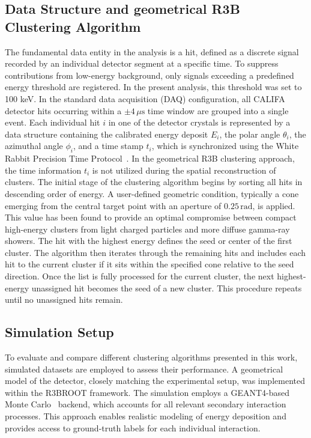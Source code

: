 \documentclass[final,5p,times,twocolumn]{elsarticle}
\begin{document}
\subsection{Data Structure and geometrical R3B Clustering Algorithm}\label{s_sec:r3b_clustering}
The fundamental data entity in the analysis is a hit, defined as a discrete signal recorded by an individual detector segment at a specific time. To suppress contributions from low-energy background, only signals exceeding a predefined energy threshold are registered. In the present analysis, this threshold was set to 100 keV.\newline
In the standard data acquisition (DAQ) configuration, all CALIFA detector hits occurring within a $\pm 4\,\mu\mathrm{s}$ time window are grouped into a single event. Each individual hit \( i \) in one of the detector crystals is represented by a data structure containing the calibrated energy deposit \( E_i \), the polar angle \( \theta_i \), the azimuthal angle \( \phi_i \), and a time stamp \( t_i \), which is synchronized using the White Rabbit Precision Time Protocol~\cite{lipinski2011white}.\newline
In the geometrical R3B clustering approach, the time information $t_i$ is not utilized during the spatial reconstruction of clusters.\newline
The initial stage of the clustering algorithm begins by sorting all hits in descending order of energy. A user-defined geometric condition, typically a cone emerging from the central target point with an aperture of $0.25\,\mathrm{rad}$, is applied. This value has been found to provide an optimal compromise between compact high-energy clusters from light charged particles and more diffuse gamma-ray showers.\newline
The hit with the highest energy defines the seed or center of the first cluster. The algorithm then iterates through the remaining hits and includes each hit to the current cluster if it sits within the specified cone relative to the seed direction. Once the list is fully processed for the current cluster, the next highest-energy unassigned hit becomes the seed of a new cluster. This procedure repeats until no unassigned hits remain.\newline
\subsection{Simulation Setup}\label{s_sec:data_sim}
To evaluate and compare different clustering algorithms presented in this work, simulated datasets are employed to assess their performance. 
A geometrical model of the detector, closely matching the experimental setup, was implemented within the R3BROOT framework. The simulation employs a GEANT4-based Monte Carlo~\cite{agostinelli2003geant4} backend, which accounts for all relevant secondary interaction processes. This approach enables realistic modeling of energy deposition and provides access to ground-truth labels for each individual interaction.\newline
\end{document}
